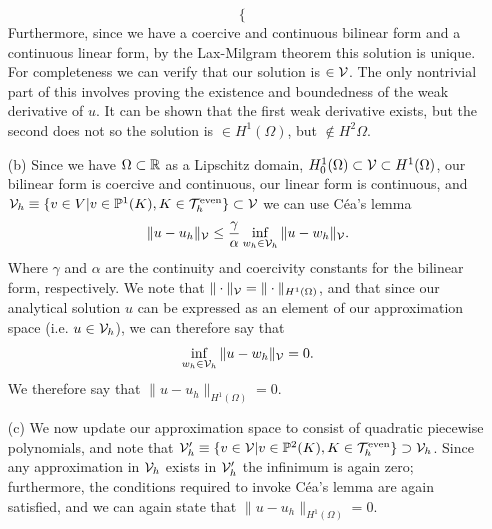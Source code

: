 \documentclass{article}
\begin{document}
\begin{itemize}
\begin{equation*}
\begin{cases}
		\end{cases}
	\end{equation*}
	Furthermore, since we have a coercive and continuous bilinear form and a continuous linear form, by the Lax-Milgram theorem this solution is unique. For completeness we can verify that our solution is \(\in \mathcal{V} \). The only nontrivial part of this involves proving the existence and boundedness of the weak derivative of \(u\). It can be shown that the first weak derivative exists, but the second does not so the solution is \(\in H^1(\Omega) \), but \(\notin H^2{\Omega} \).%
	
	\item[(b)] Since we have \(\Omega \subset \mathbb{R} \) as a Lipschitz domain, \(H^1_0(\Omega) \subset \mathcal{V} \subset H^1(\Omega) \), our bilinear form is coercive and continuous, our linear form is continuous, and \(\mathcal{V}_h \equiv \{v\in V | v \in \mathbb{P}^1(K), K \in \mathcal{T}_h^\text{even} \} \subset \mathcal{V} \) we can use C\'ea's lemma 
	\begin{equation*}
		\|u - u_h\|_{\mathcal{V}} \leq \dfrac{\gamma}{\alpha}\inf\limits_{w_h \in \mathcal{V}_h}\|u - w_h\|_{\mathcal{V}}.
	\end{equation*}
	Where \(\gamma \) and \(\alpha \) are the continuity and coercivity constants for the bilinear form, respectively. We note that \(\|\cdot\|_{\mathcal{V}} = \|\cdot\|_{H^1(\Omega)} \), and that since our analytical solution \(u\) can be expressed as an element of our approximation space (i.e. \(u \in \mathcal{V}_h \)), we can therefore say that 
	\begin{equation*}
		\inf\limits_{w_h \in \mathcal{V}_h}\|u - w_h\|_{\mathcal{V}} = 0.
	\end{equation*}
	We therefore say that \(\|u-u_h\|_{H^1(\Omega)} = 0\).
	
	\item[(c)] We now update our approximation space to consist of quadratic piecewise polynomials, and note that \(\mathcal{V}'_h \equiv \{v\in \mathcal{V} | v \in \mathbb{P}^2(K), K \in \mathcal{T}_h^\text{even} \} \supset \mathcal{V}_h \). Since any approximation in \(\mathcal{V}_h \) exists in \(\mathcal{V}'_h \) the infinimum is again zero; furthermore, the conditions required to invoke C\'ea's lemma are again satisfied, and we can again state that \(\|u-u_h\|_{H^1(\Omega)} = 0\).
	

\end{itemize}
\end{document}
